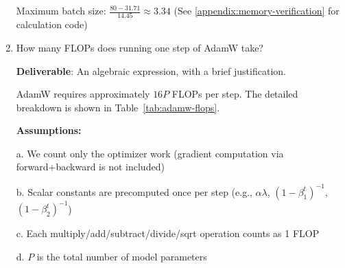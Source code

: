 \begin{enumerate}[label=(\alph*)]
\begin{answer}
    Maximum batch size: $\frac{80 - 31.71}{14.45} \approx 3.34$
    (See \ref{appendix:memory-verification} for calculation code)
    \end{answer}

    \item How many FLOPs does running one step of AdamW take?

    \textbf{Deliverable}: An algebraic expression, with a brief justification.

    \begin{answer}
    AdamW requires approximately $16P$ FLOPs per step. The detailed breakdown is shown in Table~\ref{tab:adamw-flops}.
    
    \textbf{Assumptions:}

    a. We count only the optimizer work (gradient computation via forward+backward is not included)
    
    b. Scalar constants are precomputed once per step (e.g., $\alpha\lambda$, $(1-\beta_1^t)^{-1}$, $(1-\beta_2^t)^{-1}$)
    
    c. Each multiply/add/subtract/divide/sqrt operation counts as 1 FLOP
    
    d. $P$ is the total number of model parameters
    \end{answer}


\end{enumerate}
